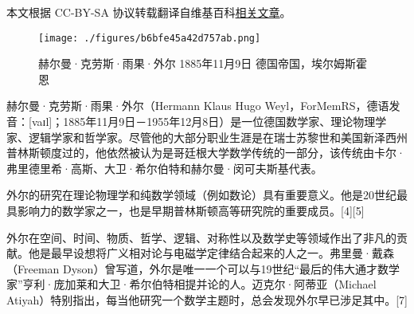 
本文根据 CC-BY-SA 协议转载翻译自维基百科\href{https://en.wikipedia.org/wiki/Hermann_Weyl#Weyl_equation}{相关文章}。

\begin{figure}[ht]
\centering
\texttt{[image: ./figures/b6bfe45a42d757ab.png]}
\caption{赫尔曼·克劳斯·雨果·外尔  1885年11月9日  德国帝国，埃尔姆斯霍恩} \label{fig_WR_1}
\end{figure}
赫尔曼·克劳斯·雨果·外尔（Hermann Klaus Hugo Weyl，ForMemRS，德语发音：[vaɪl]；1885年11月9日－1955年12月8日）是一位德国数学家、理论物理学家、逻辑学家和哲学家。尽管他的大部分职业生涯是在瑞士苏黎世和美国新泽西州普林斯顿度过的，他依然被认为是哥廷根大学数学传统的一部分，该传统由卡尔·弗里德里希·高斯、大卫·希尔伯特和赫尔曼·闵可夫斯基代表。

外尔的研究在理论物理学和纯数学领域（例如数论）具有重要意义。他是20世纪最具影响力的数学家之一，也是早期普林斯顿高等研究院的重要成员。[4][5]

外尔在空间、时间、物质、哲学、逻辑、对称性以及数学史等领域作出了非凡的贡献。他是最早设想将广义相对论与电磁学定律结合起来的人之一。弗里曼·戴森（Freeman Dyson）曾写道，外尔是唯一一个可以与19世纪“最后的伟大通才数学家”亨利·庞加莱和大卫·希尔伯特相提并论的人。迈克尔·阿蒂亚（Michael Atiyah）特别指出，每当他研究一个数学主题时，总会发现外尔早已涉足其中。[7]

